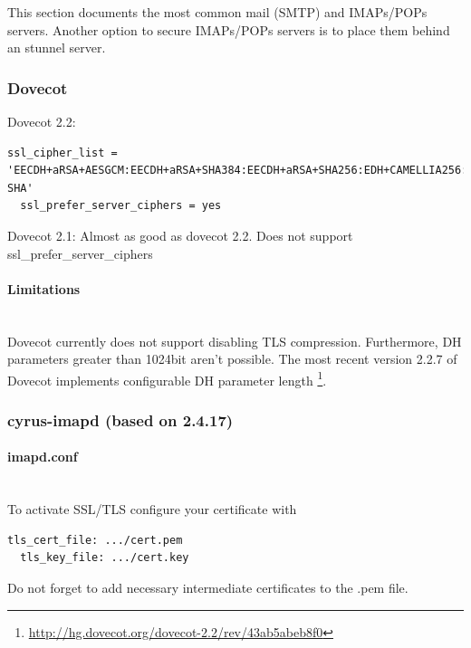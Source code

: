 This section documents the most common mail (SMTP) and IMAPs/POPs servers. Another option to secure IMAPs/POPs servers is to place them behind an stunnel server. 

\subsubsection{Dovecot}


Dovecot 2.2:


\begin{lstlisting}[breaklines]
  ssl_cipher_list = 'EECDH+aRSA+AESGCM:EECDH+aRSA+SHA384:EECDH+aRSA+SHA256:EDH+CAMELLIA256:EECDH:EDH+aRSA:+SSLv3:!aNULL:!eNULL:!LOW:!3DES:!MD5:!EXP:!PSK:!SRP:!DSS:!RC4:!SEED:!AES128:!CAMELLIA128:!ECDSA:AES256-SHA'
  ssl_prefer_server_ciphers = yes
\end{lstlisting}

Dovecot 2.1: Almost as good as dovecot 2.2. Does not support ssl\_prefer\_server\_ciphers

\paragraph*{Limitations}\mbox{}\\

Dovecot currently does not support disabling TLS compression. Furthermore, DH parameters
greater than 1024bit aren't possible. The most recent version 2.2.7 of Dovecot implements
configurable DH parameter length
\footnote{\url{http://hg.dovecot.org/dovecot-2.2/rev/43ab5abeb8f0}}.

\subsubsection{cyrus-imapd (based on 2.4.17)}

\paragraph*{imapd.conf}\mbox{}\\

To activate SSL/TLS configure your certificate with
\begin{lstlisting}[breaklines]
  tls_cert_file: .../cert.pem
  tls_key_file: .../cert.key
\end{lstlisting}

Do not forget to add necessary intermediate certificates to the .pem file.\\

